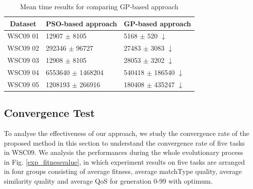 \documentclass{IEEEtran}
\begin{document}
\begin{table}[]
\centering
\caption{Mean time results for comparing GP-based approach}
\label{meanTime}
\begin{tabular}{l|l|l}
\hline
\multicolumn{1}{c|}{Dataset} & PSO-based approach & GP-based approach  \\ \hline
WSC09 01                     &12907 $\pm$ 8105      &5168 $\pm$ 520 $\downarrow$                \\ \hline
WSC09 02                     &292346 $\pm$  96727    &27483 $\pm$  3083 $\downarrow$          \\ \hline
WSC09 03                     & 12908 $\pm$ 8105   &28053 $\pm$ 3202 $\downarrow$           \\ \hline
WSC09 04                     & 6553640 $\pm$ 1468204   &540418 $\pm$ 186540 $\downarrow$            \\ \hline
WSC09 05                     & 1208193 $\pm$ 266916   &180408 $\pm$ 435247 $\downarrow$           \\ \hline
\end{tabular}
\end{table}



\subsection{Convergence Test}\label{convergenceTest}
To analyse the effectiveness of our approach, we study the convergence rate of the proposed method in this section to understand the convergence rate of five tasks in WSC09. We analysis the performances during the whole evolutionary process in Fig. \ref{exp_fitnessvalue}, in which experiment results on five tasks are arranged in four groups consisting of average fitness, average matchType quality, average similarity quality and average QoS for generation 0-99 with optimum.
\end{document}
